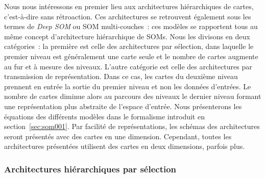 \documentclass[../main]{subfiles}
\begin{document}
Nous nous intéressons en premier lieu aux architectures hiérarchiques de cartes, c'est-à-dire sans rétroaction. Ces architectures se retrouvent également sous les termes de \emph{Deep SOM} ou SOM multi-couches~: ces modèles se rapportent tous au même concept d'architecture hiérarchique de SOMs.
Nous les divisons en deux catégories~:
la première est celle des architectures par sélection, dans laquelle le premier niveau est généralement une carte seule et le nombre de cartes augmente au fur et à mesure des niveaux. 
L'autre catégorie est celle des architectures par transmission de représentation. Dans ce cas, les cartes du deuxième niveau prennent en entrée la sortie du premier niveau et non les données d'entrées. Le nombre de cartes diminue alors au parcours des niveaux le dernier niveau formant une représentation plus abstraite de l'espace d'entrée.
Nous présenterons les équations des différents modèles dans le formalisme introduit en section~\ref{sec:som001}. 
Par facilité de représentations, les schémas des architectures seront présentés avec des cartes en une dimension. Cependant, toutes les architectures présentées utilisent des cartes en deux dimensions, parfois plus.
\subsubsection{Architectures hiérarchiques par sélection}
\end{document}
